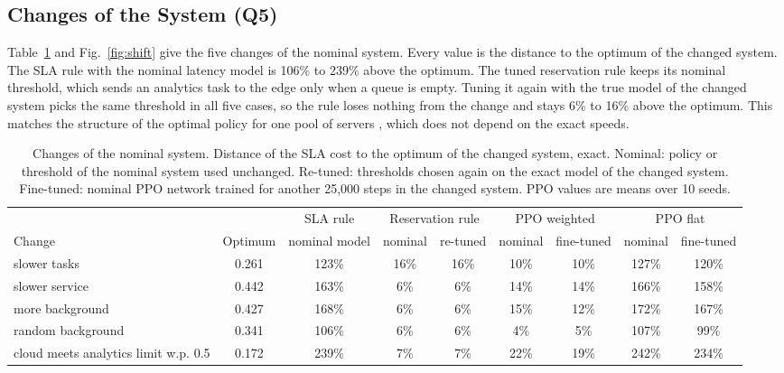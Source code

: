 \documentclass[journal]{IEEEtran}
\begin{document}
\subsection{Changes of the System (Q5)}
Table~\ref{tab:shift} and Fig.~\ref{fig:shift} give the five changes of the nominal system. Every value is the distance to the optimum of the changed system. The SLA rule with the nominal latency model is 106\% to 239\% above the optimum. The tuned reservation rule keeps its nominal threshold, which sends an analytics task to the edge only when a queue is empty. Tuning it again with the true model of the changed system picks the same threshold in all five cases, so the rule loses nothing from the change and stays 6\% to 16\% above the optimum. This matches the structure of the optimal policy for one pool of servers \cite{miller1969}, which does not depend on the exact speeds.

\begin{table}[t]
\caption{Changes of the nominal system. Distance of the SLA cost to the optimum of the changed system, exact. Nominal: policy or threshold of the nominal system used unchanged. Re-tuned: thresholds chosen again on the exact model of the changed system. Fine-tuned: nominal PPO network trained for another 25,000 steps in the changed system. PPO values are means over 10 seeds.}
\label{tab:shift}
\centering
\footnotesize
\setlength{\tabcolsep}{4pt}
\begin{tabular}{@{}lcccccccc@{}}
\toprule
 & & SLA rule & \multicolumn{2}{c}{Reservation rule} & \multicolumn{2}{c}{PPO weighted} & \multicolumn{2}{c}{PPO flat} \\
\cmidrule(lr){4-5} \cmidrule(lr){6-7} \cmidrule(l){8-9}
Change & Optimum & nominal model & nominal & re-tuned & nominal & fine-tuned & nominal & fine-tuned \\
\midrule
slower tasks & 0.261 & 123\% & 16\% & 16\% & 10\% & 10\% & 127\% & 120\% \\
slower service & 0.442 & 163\% & 6\% & 6\% & 14\% & 14\% & 166\% & 158\% \\
more background & 0.427 & 168\% & 6\% & 6\% & 15\% & 12\% & 172\% & 167\% \\
random background & 0.341 & 106\% & 6\% & 6\% & 4\% & 5\% & 107\% & 99\% \\
cloud meets analytics limit w.p. 0.5 & 0.172 & 239\% & 7\% & 7\% & 22\% & 19\% & 242\% & 234\% \\
\bottomrule
\end{tabular}
\end{table}
\end{document}

